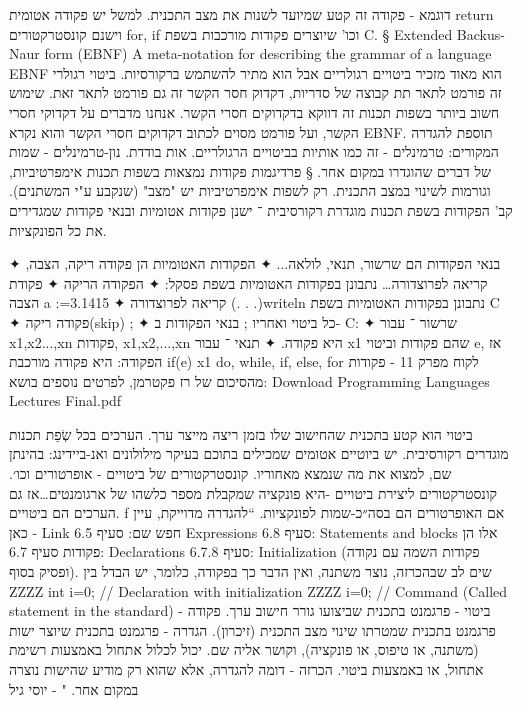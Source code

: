         דוגמא - פקודה זה קטע שמיועד לשנות את מצב התכנית.
        למשל יש פקודה אטומית return וישנם קונסטרקטורים for, if וכו' שיוצרים פקודות מורכבות בשפת C.
§ Extended Backus-Naur form (EBNF)
        A meta-notation for describing the grammar of a language
        EBNF הוא מאוד מזכיר ביטויים רגולריים אבל הוא מתיר להשתמש ברקורסיות.
        ביטוי רגולרי זה פורמט לתאר תת קבוצה של סדריות, דקדוק חסר הקשר זה גם פורמט לתאר זאת. שימוש חשוב ביותר בשפות תכנות זה דווקא בדקדוקים חסרי הקשר.
        אנחנו מדברים על דקדוקי חסרי הקשר, ועל פורמט מסוים לכתוב דקדוקים חסרי הקשר והוא נקרא EBNF. תוספת להגדרה המקורים:
        טרמינלים - זה כמו אותיות בביטויים הרגולריים. אות בודדת.
        נון-טרמינלים - שמות של דברים שהוגדרו במקום אחר.
§ פרדיגמות
        פקודות נמצאות בשפות תכנות אימפרטיביות, וגורמות לשינוי במצב התכנית.
        רק לשפות אימפרטיביות יש "מצב" (שנקבע ע"י המשתנים).
        קב' הפקודות בשפת תכנות מוגדרת רקורסיבית ־
        ישנן פקודות אטומיות ובנאי פקודות שמגדירים את כל הפונקציות.
        \begin{ציינון}
          ✦ בנאי הפקודות הם שרשור, תנאי, לולאה...
          ✦ הפקודות האטומיות הן פקודה ריקה, הצבה, קריאה לפרוצדורה…
          נתבונן בפקודות האטומיות בשפת פסקל:
          ✦ הפקודה הריקה
          ✦ פקודת הצבה a :=3.1415
          ✦ קריאה לפרוצדורה (. . .)writeln
          נתבונן בפקודות האטומיות בשפת C
          ✦ פקודה ריקה(skip) ;
          ✦ כל ביטוי ואחריו ;
          בנאי הפקודות ב- C:
          ✦ שרשור ־ עבור x1,x2...,xn פקודות, {x1,x2,...,xn} היא פקודה.
          ✦ תנאי ־ עבור x1 שהם פקודות וביטוי e, אז הפקודה:
          היא פקודה מורכבת if(e){ x1}
          do, while, if, else, for
          לקוח מפרק 11 - פקודות מהסיכום של רז פקטרמן, לפרטים נוספים בושא:
          Download Programming Languages Lectures Final.pdf
        \end{ציינון}

        ביטוי הוא קטע בתכנית שהחישוב שלו בזמן ריצה מייצר ערך. הערכים בכל שְׂפַת תכנות מוגדרים רקורסיבית. יש ביוטיים אטומים שמכילים בתוכם בעיקר מילולונים ואנ-ביידינג: בהינתן שם, למצוא את מה שנמצא מאחוריו.
        קונסטרקטורים של ביטויים - אופרטורים וכו׳.
        קונסטרקטורים ליצירת ביטויים -היא פונקציה שמקבלת מספר כלשהו של ארגומנטים…אז גם הערכים הם ביטויים. f אם האופרטורים הם בסה״כ-שמות לפונקציות.
        “להגדרה מדוייקת, עיין כאן - Link
        חפש שם: סעיף 6.5 Expressions
        סעיף 6.8: Statements and blocks אלו הן פקודות
        סעיף 6.7: Declarations
        סעיף 6.7.8: Initialization (פקודות השמה עם נקודה ופסיק בסוף).
        שים לב שבהכרזה, נוצר משתנה, ואין הדבר כך בפקודה, כלומר, יש הבדל בין
        ZZZZ int i=0; // Declaration with initialization
        ZZZZ i=0; // Command (Called statement in the standard)
        ביטוי - פרגמנט בתכנית שביצועו גורר חישוב ערך.
        פקודה - פרגמנט בתכנית שמטרתו שינוי מצב התכנית (זיכרון).
        הגדרה - פרגמנט בתכנית שיוצר ישות (משתנה, או טיפוס, או פונקציה), וקושר אליה שם. יכול לכלול אתחול באמצעות רשימת אתחול, או באמצעות ביטוי.
        הכרזה - דומה להגדרה, אלא שהוא רק מודיע שהישות נוצרה במקום אחר. "
        - יוסי גיל

